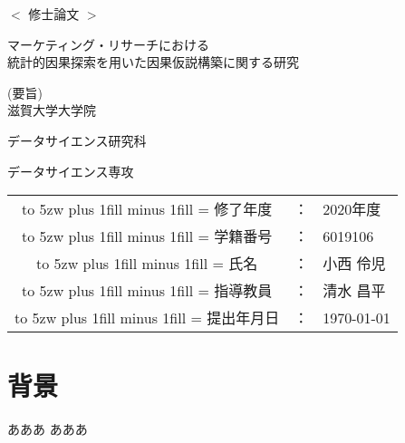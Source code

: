 \documentclass[11pt,uplatex]{jsarticle}
\theoremstyle{definition}
\newcommand{\kintou}[2]{%
\leavevmode
\hbox to #1{%
\kanjiskip=0pt plus 1fill minus 1fill
\xkanjiskip=\kanjiskip
#2}}
\begin{document}
\begin{center}
  \vspace*{15mm}
  \huge $<$ 修士論文 $>$ \par
  \vspace{15mm}
  \LARGE マーケティング・リサーチにおける \\
  統計的因果探索を用いた因果仮説構築に関する研究 \par
  \vspace{10.5mm}
  \Large (要旨) \\
  \vspace{10.5mm}
  \Large 滋賀大学大学院 \par
  \Large データサイエンス研究科 \par
  \Large データサイエンス専攻 \par
  \vspace{30mm}
  \Large
  \begin{tabular}{ccl}
    \kintou{5zw}{修了年度}&：& 2020年度 \\
    \kintou{5zw}{学籍番号}&：& 6019106 \\
    \kintou{5zw}{氏名}&：& 小西 伶児 \\
    \kintou{5zw}{指導教員}&：& 清水 昌平 \\
    \kintou{5zw}{提出年月日}&：& \today \\
  \end{tabular}
\end{center}

\thispagestyle{empty}
\newpage

\section{背景}
あああ
あああ
%
\end{document}
